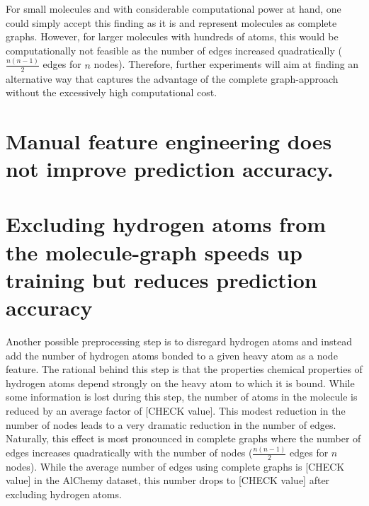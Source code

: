 For small molecules and with considerable computational power at hand, one could simply accept this finding as it is and represent molecules as complete graphs. However, for larger molecules with hundreds of atoms, this would be computationally not feasible as the number of edges increased quadratically ($\frac{n(n - 1)}{2}$ edges for $n$ nodes). Therefore, further experiments will aim at finding an alternative way that captures the advantage of the complete graph-approach without the excessively high computational cost.


%
%


\section{Manual feature engineering does not improve prediction accuracy.}


\section{Excluding hydrogen atoms from the molecule-graph speeds up training but reduces prediction accuracy}

Another possible preprocessing step is to disregard hydrogen atoms and instead add the number of hydrogen atoms bonded to a given heavy atom as a node feature. The rational behind this step is that the properties chemical properties of hydrogen atoms depend strongly on the heavy atom to which it is bound. While some information is lost during this step, the number of atoms in the molecule is reduced by an average factor of [CHECK value]. This modest reduction in the number of nodes leads to a very dramatic reduction in the number of edges. Naturally, this effect is most pronounced in complete graphs where the number of edges increases quadratically with the number of nodes ($\frac{n(n - 1)}{2}$ edges for $n$ nodes). While the average number of edges using complete graphs is [CHECK value] in the AlChemy dataset, this number drops to [CHECK value] after excluding hydrogen atoms.

